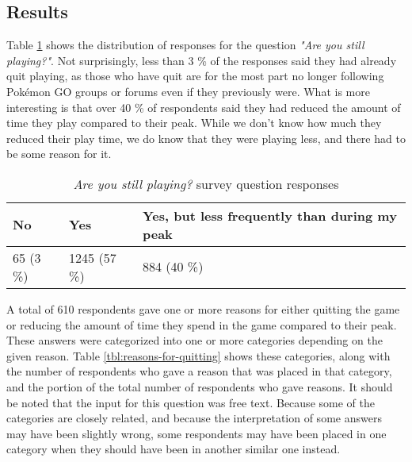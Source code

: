 

\subsection{Results}

Table \ref{tbl:still-playing} shows the distribution of responses for the question \emph{"Are you still playing?"}. Not surprisingly, less than 3 \% of the responses said they had already quit playing, as those who have quit are for the most part no longer following Pokémon GO groups or forums even if they previously were. What is more interesting is that over 40 \% of respondents said they had reduced the amount of time they play compared to their peak. While we don't know how much they reduced their play time, we do know that they were playing less, and there had to be some reason for it.

\begin{table}[h]
	\centering
	\begin{tabular}{|l|l|l|}
		\hline
		\textbf{No} & \textbf{Yes} & \textbf{Yes, but less frequently than during my peak}\\
		\hline\hline
		65 (3 \%) & 1245 (57 \%) & 884 (40 \%)\\\hline
	\end{tabular}
	\caption{\emph{Are you still playing?} survey question responses}
	\label{tbl:still-playing}
\end{table}

A total of 610 respondents gave one or more reasons for either quitting the game or reducing the amount of time they spend in the game compared to their peak. These answers were categorized into one or more categories depending on the given reason. Table \ref{tbl:reasons-for-quitting} shows these categories, along with the number of respondents who gave a reason that was placed in that category, and the portion of the total number of respondents who gave reasons. It should be noted that the input for this question was free text. Because some of the categories are closely related, and because the interpretation of some answers may have been slightly wrong, some respondents may have been placed in one category when they should have been in another similar one instead.

